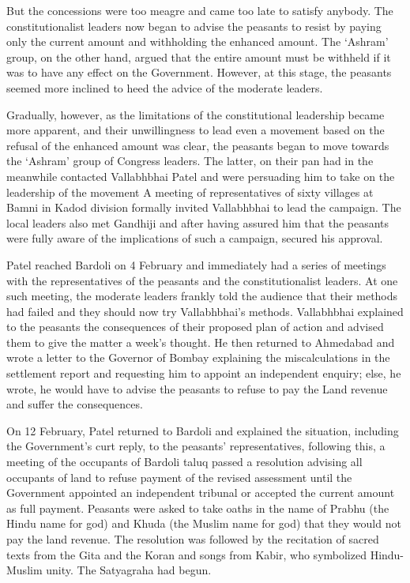 \begin{multicols}{2}
But the concessions were too meagre and came too late to satisfy anybody. The constitutionalist leaders now began to advise the peasants to resist by paying only the current amount and withholding the enhanced amount. The `Ashram' group, on the other hand, argued that the entire amount must be withheld if it was to have any effect on the Government. However, at this stage, the peasants seemed more inclined to heed the advice of the moderate leaders.

Gradually, however, as the limitations of the constitutional leadership became more apparent, and their unwillingness to lead even a movement based on the refusal of the enhanced amount was clear, the peasants began to move towards the `Ashram' group of Congress leaders. The latter, on their pan had in the meanwhile contacted Vallabhbhai Patel and were persuading him to take on the leadership of the movement A meeting of representatives of sixty villages at Bamni in Kadod division formally invited Vallabhbhai to lead the campaign. The local leaders also met Gandhiji and after having assured him that the peasants were fully aware of the implications of such a campaign, secured his approval.

Patel reached Bardoli on 4 February and immediately had a series of meetings with the representatives of the peasants and the constitutionalist leaders. At one such meeting, the moderate leaders frankly told the audience that their methods had failed and they should now try Vallabhbhai's methods. Vallabhbhai explained to the peasants the consequences of their proposed plan of action and advised them to give the matter a week's thought. He then returned to Ahmedabad and wrote a letter to the Governor of Bombay explaining the miscalculations in the settlement report and requesting him to appoint an independent enquiry; else, he wrote, he would have to advise the peasants to refuse to pay the Land revenue and suffer the consequences.

On 12 February, Patel returned to Bardoli and explained the situation, including the Government's curt reply, to the peasants' representatives, following this, a meeting of the occupants of Bardoli taluq passed a resolution advising all occupants of land to refuse payment of the revised assessment until the Government appointed an independent tribunal or accepted the current amount as full payment. Peasants were asked to take oaths in the name of Prabhu (the Hindu name for god) and Khuda (the Muslim name for god) that they would not pay the land revenue. The resolution was followed by the recitation of sacred texts from the Gita and the Koran and songs from Kabir, who symbolized Hindu-Muslim unity. The Satyagraha had begun.


\end{multicols}
